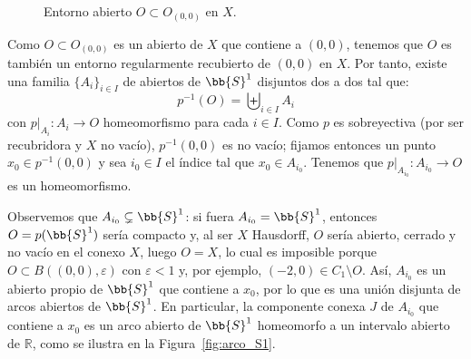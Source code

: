 \documentclass[12pt]{article}
\begin{document}
\begin{ejercicio}
\begin{enumerate}[label=\alph*)]
\begin{figure}[h]
                    \caption{Entorno abierto $O\subset O_{(0,0)}$ en $X$.}
                    \label{fig:entorno_X}
                \end{figure}

                Como $O\subset O_{(0,0)}$ es un abierto de $X$ que contiene a $(0,0)$, tenemos que $O$ es también un entorno regularmente recubierto de $(0,0)$ en $X$. Por tanto, existe una familia $\{A_i\}_{i\in I}$ de abiertos de $\bb{S}^1$ disjuntos dos a dos tal que:
                \begin{equation*}
                    p^{-1}(O) = \biguplus_{i\in I} A_i
                \end{equation*}
                con $p\big|_{A_i}:A_i\to O$ homeomorfismo para cada $i\in I$. Como $p$ es sobreyectiva (por ser recubridora y $X$ no vacío), $p^{-1}(0,0)$ es no vacío; fijamos entonces un punto $x_0\in p^{-1}(0,0)$ y sea $i_0\in I$ el índice tal que $x_0\in A_{i_0}$. Tenemos que $p\big|_{A_{i_0}}:A_{i_0}\to O$ es un homeomorfismo.

                Observemos que $A_{i_0}\subsetneq \bb{S}^1$: si fuera $A_{i_0}=\bb{S}^1$, entonces $O = p(\bb{S}^1)$ sería compacto y, al ser $X$ Hausdorff, $O$ sería abierto, cerrado y no vacío en el conexo $X$, luego $O=X$, lo cual es imposible porque $O\subset B((0,0),\varepsilon)$ con $\varepsilon<1$ y, por ejemplo, $(-2,0)\in C_1\setminus O$. Así, $A_{i_0}$ es un abierto propio de $\bb{S}^1$ que contiene a $x_0$, por lo que es una unión disjunta de arcos abiertos de $\bb{S}^1$. En particular, la componente conexa $J$ de $A_{i_0}$ que contiene a $x_0$ es un arco abierto de $\bb{S}^1$ homeomorfo a un intervalo abierto de $\mathbb{R}$, como se ilustra en la Figura~\ref{fig:arco_S1}.
                \begin{figure}[h]
                    \centering
\end{figure}
\end{enumerate}
\end{ejercicio}
\end{document}
